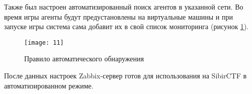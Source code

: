 Также был настроен автоматизированный поиск агентов в указанной сети. Во время игры агенты будут предустановлены на виртуальные машины и при запуске игры система сама добавит их в свой список мониторинга (рисунок \ref{img:11}).

\begin{figure}[h!]
    \centering
    \texttt{[image: 11]}
    \caption{Правило автоматического обнаружения}
    \label{img:11}
\end{figure} 

После данных настроек Zabbix-сервер готов для использования на SibirCTF в автоматизированном режиме.\\